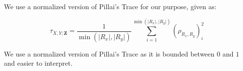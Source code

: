 We use a normalized version of Pillai's Trace for our purpose, given as:

\begin{equation}
	\tau_{X, Y; \bm{Z}} = \frac{1}{\min(\rvert R_x \rvert, \rvert R_y \rvert)}
	\sum_{i=1}^{\min(\rvert R_x \rvert, \rvert R_y \rvert)} (\rho_{R_x, R_y})_i^2
\end{equation}

We use a normalized version of Pillai's Trace as it is bounded between $ 0 $
and $ 1 $ and easier to interpret.


% 
